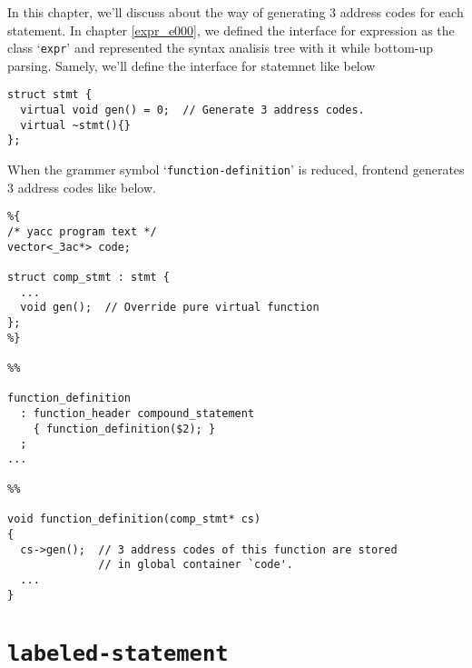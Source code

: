 \label{stmt_e006}
In this chapter, we'll discuss about the way of generating 3 address
codes for each statement. In chapter \ref{expr_e000}, we defined the
interface for expression as the class `{\tt{expr}}' and represented
the syntax analisis tree with it while bottom-up parsing. Samely,
we'll define the interface for statemnet like below
\begin{verbatim}
struct stmt {
  virtual void gen() = 0;  // Generate 3 address codes.
  virtual ~stmt(){}
};
\end{verbatim}
When the grammer symbol `{\tt{function-definition}}' is reduced,
frontend generates 3 address codes like below.
\begin{verbatim}
%{
/* yacc program text */
vector<_3ac*> code;

struct comp_stmt : stmt {
  ...
  void gen();  // Override pure virtual function
};
%}

%%

function_definition
  : function_header compound_statement
    { function_definition($2); }
  ;
...

%%

void function_definition(comp_stmt* cs)
{
  cs->gen();  // 3 address codes of this function are stored
              // in global container `code'.
  ...
}
\end{verbatim}

\section{{\tt{labeled-statement}}}

